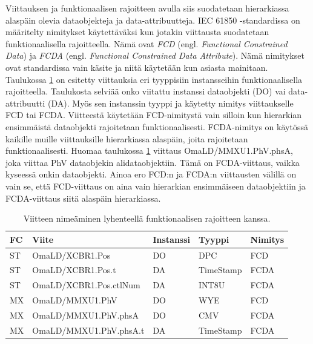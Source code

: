 Viittauksen ja funktionaalisen rajoitteen avulla siis suodatetaan hierarkiassa alaspäin olevia dataobjekteja ja data-attribuutteja. IEC 61850 -standardissa on määritelty nimitykset käytettäväksi kun jotakin viittausta suodatetaan funktionaalisella rajoitteella. Nämä ovat \emph{FCD} (engl. \emph{Functional Constrained Data}) ja \emph{FCDA} (engl. \emph{Functional Constrained Data Attribute}). Nämä nimitykset ovat standardissa vain käsite ja niitä käytetään kun asiasta mainitaan. Taulukossa \ref{tab:fcd-ja-fcda} on esitetty viittauksia eri tyyppisiin instansseihin funktionaalisella rajoitteella. Taulukosta selviää onko viitattu instanssi dataobjekti (DO) vai data-attribuutti (DA). Myös sen instanssin tyyppi ja käytetty nimitys viittaukselle FCD tai FCDA. Viitteestä käytetään FCD-nimitystä vain silloin kun hierarkian ensimmäistä dataobjekti rajoitetaan funktionaalisesti. FCDA-nimitys on käytössä kaikille muille viittauksille hierarkiassa alaspäin, joita rajoitetaan funktionaalisesti. Huomaa taulukossa \ref{tab:fcd-ja-fcda} viittaus OmaLD/MMXU1.PhV.phsA, joka viittaa PhV dataobjekin alidataobjektiin. Tämä on FCDA-viittaus, vaikka kyseessä onkin dataobjekti. Ainoa ero FCD:n ja FCDA:n viittausten välillä on vain se, että FCD-viittaus on aina vain hierarkian ensimmäiseen dataobjektiin ja FCDA-viittaus siitä alaspäin hierarkiassa. \mbox{\cite[s.~55]{IEC61850-7-2}} \mbox{\cite[s.~63]{IEC61850-8-1}}

\begin{table}[ht!]
	\caption{Viitteen nimeäminen lyhenteellä funktionaalisen rajoitteen kanssa.}
	\label{tab:fcd-ja-fcda}
	\begin{tabular}{l | l | l | l | l}
		\hline
		\textbf{FC} & \textbf{Viite} & \textbf{Instanssi} & \textbf{Tyyppi} & \textbf{Nimitys} \\
		\hline \hline
		ST & OmaLD/XCBR1.Pos & DO & DPC & FCD \\
		ST & OmaLD/XCBR1.Pos.t & DA & TimeStamp & FCDA \\
		ST & OmaLD/XCBR1.Pos.ctlNum & DA & INT8U & FCDA \\
		MX & OmaLD/MMXU1.PhV & DO & WYE & FCD \\
		MX & OmaLD/MMXU1.PhV.phsA & DO & CMV & FCDA \\
		MX & OmaLD/MMXU1.PhV.phsA.t & DA & TimeStamp & FCDA \\
		\hline
	\end{tabular}
\end{table}

